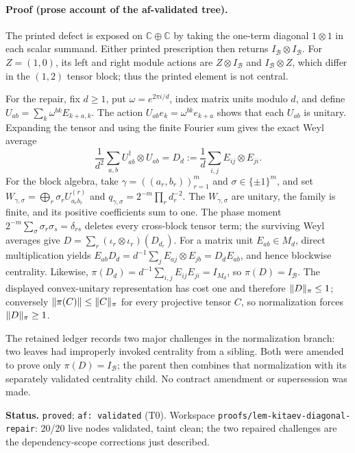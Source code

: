 \paragraph{Proof (prose account of the af-validated tree).}
The printed defect is exposed on $\mathbb C\oplus\mathbb C$ by taking the one-term
diagonal $1\otimes1$ in each scalar summand.  Either printed prescription then returns
$I_{\mathcal B}\otimes I_{\mathcal B}$.  For $Z=(1,0)$, its left and right module
actions are $Z\otimes I_{\mathcal B}$ and $I_{\mathcal B}\otimes Z$, which differ in
the $(1,2)$ tensor block; thus the printed element is not central.

For the repair, fix $d\ge1$, put $\omega=e^{2\pi i/d}$, index matrix units modulo $d$,
and define $U_{ab}=\sum_k\omega^{bk}E_{k+a,k}$.
The action $U_{ab}e_k=\omega^{bk}e_{k+a}$ shows that each $U_{ab}$ is unitary.  Expanding
the tensor and using the finite Fourier sum gives the exact Weyl average
\[
  \frac1{d^2}\sum_{a,b}U_{ab}^{\dagger}\otimes U_{ab}
  =D_d:=\frac1d\sum_{i,j}E_{ij}\otimes E_{ji}.
\]
For the block algebra, take
$\gamma=((a_r,b_r))_{r=1}^{m}$ and $\sigma\in\{\pm1\}^{m}$, and set
$W_{\gamma,\sigma}=\bigoplus_r\sigma_rU^{(r)}_{a_rb_r}$ and
$q_{\gamma,\sigma}=2^{-m}\prod_r d_r^{-2}$.
The $W_{\gamma,\sigma}$ are unitary, the family is finite, and its positive coefficients
sum to one.  The phase moment
$2^{-m}\sum_\sigma\sigma_r\sigma_s=\delta_{rs}$ deletes every cross-block tensor term;
the surviving Weyl averages give $D=\sum_r(\iota_r\otimes\iota_r)(D_{d_r})$.
For a matrix unit $E_{ab}\in M_d$, direct multiplication yields
$E_{ab}D_d=d^{-1}\sum_jE_{aj}\otimes E_{jb}=D_dE_{ab}$, and hence blockwise centrality.
Likewise,
$\pi(D_d)=d^{-1}\sum_{i,j}E_{ij}E_{ji}=I_{M_d}$, so
$\pi(D)=I_{\mathcal B}$.  The displayed convex-unitary representation has cost one and
therefore $\lVert D\rVert_\pi\le1$; conversely
$\lVert \pi(C)\rVert\le\lVert C\rVert_\pi$ for every projective tensor $C$, so normalization forces
$\lVert D\rVert_\pi\ge1$.

The retained ledger records two major challenges in the normalization branch: two leaves
had improperly invoked centrality from a sibling.  Both were amended to prove only
$\pi(D)=I_{\mathcal B}$; the parent then combines that normalization with its separately
validated centrality child.  No contract amendment or supersession was made.

\medskip
\noindent\textbf{Status.} \texttt{proved}; \texttt{af: validated} (T0).  Workspace
\texttt{proofs/lem-kitaev-diagonal-repair}: 20/20 live nodes validated, taint clean;
the two repaired challenges are the dependency-scope corrections just described.

